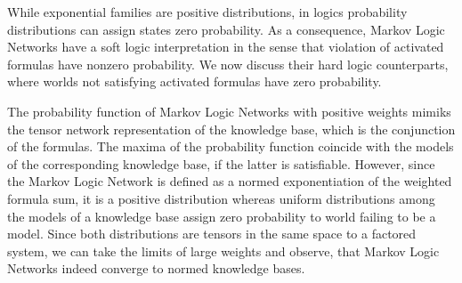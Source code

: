 \label{sec:hardNetworks} %

While exponential families are positive distributions, in logics probability distributions can assign states zero probability.
As a consequence, Markov Logic Networks have a soft logic interpretation in the sense that violation of activated formulas have nonzero probability.
We now discuss their hard logic counterparts, where worlds not satisfying activated formulas have zero probability.


The probability function of Markov Logic Networks with positive weights mimiks the tensor network representation of the knowledge base, which is the conjunction of the formulas. 
The maxima of the probability function coincide with the models of the corresponding knowledge base, if the latter is satisfiable.
However, since the Markov Logic Network is defined as a normed exponentiation of the weighted formula sum, it is a positive distribution whereas uniform distributions among the models of a knowledge base assign zero probability to world failing to be a model.
Since both distributions are tensors in the same space to a factored system, we can take the limits of large weights and observe, that Markov Logic Networks indeed converge to normed knowledge bases.

